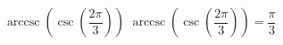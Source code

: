  {$\operatorname{arccsc}\left(\csc\left( \dfrac{2\pi}{3} \right) \right)$}
{ $\operatorname{arccsc}\left(\csc\left( \dfrac{2\pi}{3} \right) \right) = \dfrac{\pi}{3}$}

